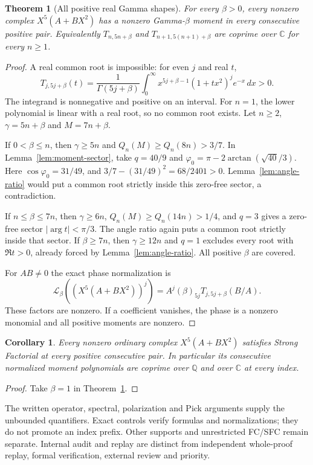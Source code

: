 \documentclass[11pt]{article}
\newtheorem{theorem}{Theorem}
\newtheorem{corollary}{Corollary}
\begin{document}
\begin{theorem}[All positive real Gamma shapes]\label{thm:gamma-sfc}
For every $\beta>0$, every nonzero complex $X^5(A+BX^2)$
has a nonzero Gamma-$\beta$ moment in every consecutive positive pair.
Equivalently $T_{n,5n+\beta}$ and $T_{n+1,5(n+1)+\beta}$
are coprime over $\mathbb C$ for every $n\ge1$.
\end{theorem}
\begin{proof}
A real common root is impossible: for even $j$ and real $t$,
\[
 T_{j,5j+\beta}(t)=\frac1{\Gamma(5j+\beta)}
 \int_0^\infty x^{5j+\beta-1}(1+tx^2)^j e^{-x}\,dx>0.
\]
The integrand is nonnegative and positive on an interval.
For $n=1$, the lower polynomial is linear with a real root,
so no common root exists.
Let $n\ge2$, $\gamma=5n+\beta$ and $M=7n+\beta$.

If $0<\beta\le n$, then $\gamma\ge5n$ and
$Q_n(M)\ge Q_n(8n)>3/7$.
In Lemma~\ref{lem:moment-sector}, take $q=40/9$ and
$\varphi_0=\pi-2\arctan(\sqrt{40}/3)$.
Here $\cos\varphi_0=31/49$, and
$3/7-(31/49)^2=68/2401>0$.
Lemma~\ref{lem:angle-ratio} would put a common root strictly inside
this zero-free sector, a contradiction.

If $n\le\beta\le7n$, then $\gamma\ge6n$,
$Q_n(M)\ge Q_n(14n)>1/4$, and $q=3$ gives a zero-free sector
$|\arg t|<\pi/3$. The angle ratio again puts a common root
strictly inside that sector.
If $\beta\ge7n$, then $\gamma\ge12n$ and $q=1$ excludes every
root with $\Re t>0$, already forced by Lemma~\ref{lem:angle-ratio}.
All positive $\beta$ are covered.

For $AB\ne0$ the exact phase normalization is
\[
 \mathcal L_\beta((X^5(A+BX^2))^j)
   =A^j(\beta)_{5j}T_{j,5j+\beta}(B/A).
\]
These factors are nonzero.
If a coefficient vanishes, the phase is a nonzero monomial and
all positive moments are nonzero.
\end{proof}

\begin{corollary}\label{cor:ordinary-sfc}
Every nonzero ordinary complex $X^5(A+BX^2)$ satisfies Strong
Factorial at every positive consecutive pair.
In particular its consecutive normalized moment polynomials are
coprime over $\mathbb Q$ and over $\mathbb C$ at every index.
\end{corollary}
\begin{proof}
Take $\beta=1$ in Theorem~\ref{thm:gamma-sfc}.
\end{proof}

The written operator, spectral, polarization and Pick arguments
supply the unbounded quantifiers. Exact controls verify formulas
and normalizations; they do not promote an index prefix.
Other supports and unrestricted FC/SFC remain separate.
Internal audit and replay are distinct from independent whole-proof
replay, formal verification, external review and priority.
\end{document}
